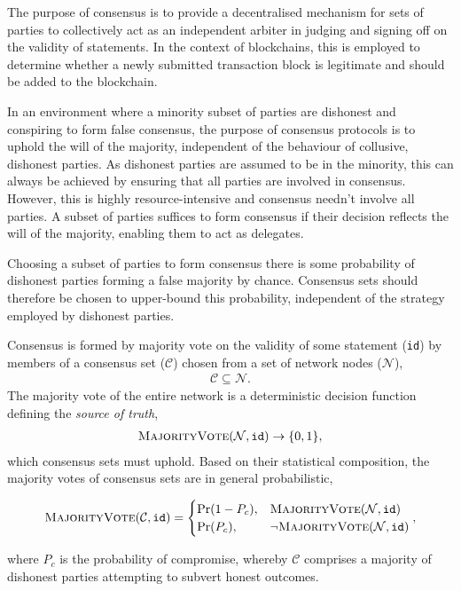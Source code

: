 \documentclass[twocolumn, aps, amsmath, amssymb, nofootinbib, superscriptaddress, longbibliography, floatfix, eqsecnum, rmp]{revtex4-2}
\begin{document}
The purpose of consensus is to provide a decentralised mechanism for sets of parties to collectively act as an independent arbiter in judging and signing off on the validity of statements. In the context of blockchains, this is employed to determine whether a newly submitted transaction block is legitimate and should be added to the blockchain.

In an environment where a minority subset of parties are dishonest and conspiring to form false consensus, the purpose of consensus protocols is to uphold the will of the majority, independent of the behaviour of collusive, dishonest parties. As dishonest parties are assumed to be in the minority, this can always be achieved by ensuring that all parties are involved in consensus. However, this is highly resource-intensive and consensus needn't involve all parties. A subset of parties suffices to form consensus if their decision reflects the will of the majority, enabling them to act as delegates.

Choosing a subset of parties to form consensus there is some probability of dishonest parties forming a false majority by chance. Consensus sets should therefore be chosen to upper-bound this probability, independent of the strategy employed by dishonest parties.

Consensus is formed by majority vote on the validity of some statement (\texttt{id}) by members of a consensus set ($\mathcal{C}$) chosen from a set of network nodes ($\mathcal{N}$),
\begin{align}
	\mathcal{C}\subseteq\mathcal{N}.
\end{align}
The majority vote of the entire network is a deterministic decision function defining the \emph{source of truth},
\begin{align} \label{eq:majority_vote_det}
	\textsc{MajorityVote}(\mathcal{N},\mathtt{id})\to\{0,1\},
\end{align}
which consensus sets must uphold. Based on their statistical composition, the majority votes of consensus sets are in general probabilistic, 
\begin{widetext}
	\begin{align*}
	\textsc{MajorityVote}(\mathcal{C},\mathtt{id}) = \begin{cases}
        \mathrm{Pr}(1-P_c), & \textsc{MajorityVote}(\mathcal{N}, \mathtt{id}) \\
        \mathrm{Pr}(P_c), & \neg \textsc{MajorityVote}(\mathcal{N}, \mathtt{id})
    \end{cases},
	\end{align*}
\end{widetext}
where $P_c$ is the probability of compromise, whereby $\mathcal{C}$ comprises a majority of dishonest parties attempting to subvert honest outcomes.
\end{document}
